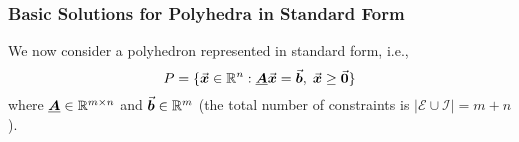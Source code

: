





\subsubsection{Basic Solutions for Polyhedra in Standard Form}\label{sec:basic_solutions_standard_form}

We now consider a polyhedron represented in standard form, i.e.,
\begin{equation}\label{eq:polyhedron_standard_form}
P = \{ \vec{\boldsymbol{x}} \in \mathbb{R}^n : \underline{\boldsymbol{A}} \vec{\boldsymbol{x}} = \vec{\boldsymbol{b}}, \; \vec{\boldsymbol{x}} \geq \vec{\boldsymbol{0}} \}
\end{equation}
where \(\underline{\boldsymbol{A}} \in \mathbb{R}^{m\times n}\) and \(\vec{\boldsymbol{b}} \in \mathbb{R}^{m}\) (the total number of constraints is \(|\mathcal{E} \cup \mathcal{I}| = m + n\)).

